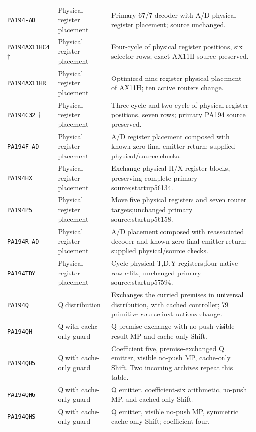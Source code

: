 \begin{longtable}{@{}>{\raggedright\arraybackslash}p{}>{\raggedright\arraybackslash}p{}>{\raggedright\arraybackslash}p{}@{}}
\nolinkurl{PA194-AD} & Physical register placement & Primary 67/7 decoder with A/D physical register placement; source unchanged.\\
\nolinkurl{PA194AX11HC4} $\dagger$ & Physical register placement & Four-cycle of physical register positions, six selector rows; exact AX11H source preserved.\\
\nolinkurl{PA194AX11HR} & Physical register placement & Optimized nine-register physical placement of AX11H; ten active routers change.\\
\nolinkurl{PA194C32} $\dagger$ & Physical register placement & Three-cycle and two-cycle of physical register positions, seven rows; primary PA194 source preserved.\\
\nolinkurl{PA194F_AD} & Physical register placement & A/D register placement composed with known-zero final emitter return; supplied physical/source checks.\\
\nolinkurl{PA194HX} & Physical register placement & Exchange physical H/X register blocks, preserving complete primary source;startup56134.\\
\nolinkurl{PA194P5} & Physical register placement & Move five physical registers and seven router targets;unchanged primary source;startup56158.\\
\nolinkurl{PA194R_AD} & Physical register placement & A/D placement composed with reassociated decoder and known-zero final emitter return; supplied physical/source checks.\\
\nolinkurl{PA194TDY} & Physical register placement & Cycle physical T,D,Y registers;four native row edits, unchanged primary source;startup57594.\\
\nolinkurl{PA194Q} & Q distribution & Exchanges the curried premises in universal distribution, with cached controller; 79 primitive source instructions change.\\
\nolinkurl{PA194QH} & Q with cache-only guard & Q premise exchange with no-push visible-result MP and cache-only Shift.\\
\nolinkurl{PA194QH5} & Q with cache-only guard & Coefficient five, premise-exchanged Q emitter, visible no-push MP, cache-only Shift. Two incoming archives repeat this table.\\
\nolinkurl{PA194QH6} & Q with cache-only guard & Q emitter, coefficient-six arithmetic, no-push MP, and cached-only Shift.\\
\nolinkurl{PA194QHS} & Q with cache-only guard & Q emitter, visible no-push MP, symmetric cache-only Shift; coefficient four.\\

\end{longtable}
